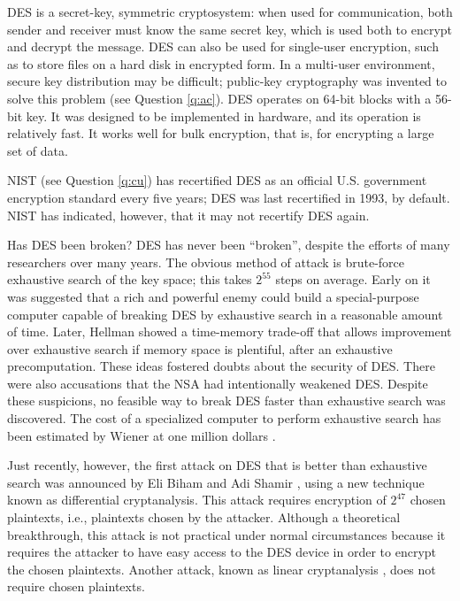 DES is a secret-key, symmetric cryptosystem: when used for communication,
both sender and receiver must know the same secret key, which is used both
to encrypt and decrypt the message. DES can also be used for single-user
encryption, such as to store files on a hard disk in encrypted form. In
a multi-user environment, secure key distribution may be difficult; public-key
cryptography was invented to solve this problem (see Question \ref{q:ac}).
DES operates on 64-bit blocks with a 56-bit key. It was designed to be 
implemented in hardware, and its operation is relatively fast. It works
well for bulk encryption, that is, for encrypting a large set of data. 

NIST (see Question \ref{q:cu}) has recertified DES as an official U.S.
government encryption standard every five years; DES was last recertified
in 1993, by default. NIST has indicated, however, that it may not recertify 
DES again.

{Has DES been broken?}
DES has never been ``broken'', despite the efforts of many researchers 
over many years. The obvious method of attack is brute-force exhaustive 
search of the key space; this takes $2^{55}$ steps on average. Early on 
it was suggested \cite{diffie-hellman-des} that a rich and powerful enemy 
could build a special-purpose computer capable of breaking DES by exhaustive 
search in a reasonable amount of time. Later, Hellman \cite{hellman-tradeoff} 
showed a time-memory trade-off that allows improvement over exhaustive 
search if memory space is plentiful, after an exhaustive precomputation. 
These ideas fostered doubts about the security of DES. There were also 
accusations that the NSA had intentionally weakened DES. Despite these 
suspicions, no feasible way to break DES faster than exhaustive search 
was discovered. The cost of a specialized computer to perform exhaustive 
search has been estimated by Wiener at one million dollars 
\cite{wiener-des-search}.

Just recently, however, the first attack on DES that is better than 
exhaustive search was announced by Eli Biham and Adi Shamir \cite
{biham-shamir-book,biham-full-des}, using a new technique known as 
differential cryptanalysis. This attack requires encryption of $2^{47}$ 
chosen plaintexts, i.e., plaintexts chosen by the attacker. Although a 
theoretical breakthrough, this attack is not practical under normal 
circumstances because it requires the attacker to have easy access to 
the DES device in order to encrypt the chosen plaintexts. Another attack,
known as linear cryptanalysis \cite{matsui-linear}, does not require 
chosen plaintexts.

